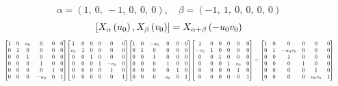\documentclass[11pt]{article}
\theoremstyle{definition}
\begin{document}
\[
\alpha = \left( 1, \  0, \  -1, \  0, \  0, \  0\right), \quad \beta = \left( -1, \  1, \  0, \  0, \  0, \  0\right)
\]
\[
\scaletoalign{\textwidth}{\left[ X_{\alpha}\left(u_{0}\right), X_{\beta}\left(v_{0}\right) \right] = X_{\alpha + \beta}\left(- u_{0} v_{0}\right)}
\]
\[
\scaletoalign{\textwidth}{{\left[\begin{matrix}1 & 0 & u_{0} & 0 & 0 & 0\\0 & 1 & 0 & 0 & 0 & 0\\0 & 0 & 1 & 0 & 0 & 0\\0 & 0 & 0 & 1 & 0 & 0\\0 & 0 & 0 & 0 & 1 & 0\\0 & 0 & 0 & - u_{0} & 0 & 1\end{matrix}\right]} {\left[\begin{matrix}1 & 0 & 0 & 0 & 0 & 0\\v_{0} & 1 & 0 & 0 & 0 & 0\\0 & 0 & 1 & 0 & 0 & 0\\0 & 0 & 0 & 1 & - v_{0} & 0\\0 & 0 & 0 & 0 & 1 & 0\\0 & 0 & 0 & 0 & 0 & 1\end{matrix}\right]} {\left[\begin{matrix}1 & 0 & - u_{0} & 0 & 0 & 0\\0 & 1 & 0 & 0 & 0 & 0\\0 & 0 & 1 & 0 & 0 & 0\\0 & 0 & 0 & 1 & 0 & 0\\0 & 0 & 0 & 0 & 1 & 0\\0 & 0 & 0 & u_{0} & 0 & 1\end{matrix}\right]} {\left[\begin{matrix}1 & 0 & 0 & 0 & 0 & 0\\- v_{0} & 1 & 0 & 0 & 0 & 0\\0 & 0 & 1 & 0 & 0 & 0\\0 & 0 & 0 & 1 & v_{0} & 0\\0 & 0 & 0 & 0 & 1 & 0\\0 & 0 & 0 & 0 & 0 & 1\end{matrix}\right]} = {\left[\begin{matrix}1 & 0 & 0 & 0 & 0 & 0\\0 & 1 & - u_{0} v_{0} & 0 & 0 & 0\\0 & 0 & 1 & 0 & 0 & 0\\0 & 0 & 0 & 1 & 0 & 0\\0 & 0 & 0 & 0 & 1 & 0\\0 & 0 & 0 & 0 & u_{0} v_{0} & 1\end{matrix}\right]}}
\]
\end{document}

